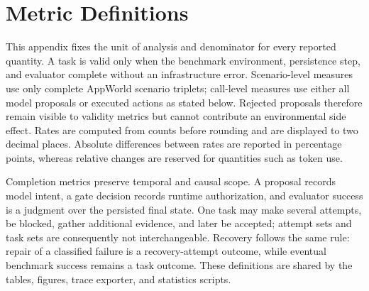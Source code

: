 \section{Metric Definitions}
\label{app:metrics}

This appendix fixes the unit of analysis and denominator for every reported
quantity. A task is valid only when the benchmark environment, persistence step,
and evaluator complete without an infrastructure error. Scenario-level measures
use only complete AppWorld scenario triplets; call-level measures use either all
model proposals or executed actions as stated below. Rejected proposals therefore
remain visible to validity metrics but cannot contribute an environmental side
effect. Rates are computed from counts before rounding and are displayed to two
decimal places. Absolute differences between rates are reported in percentage
points, whereas relative changes are reserved for quantities such as token use.

Completion metrics preserve temporal and causal scope. A proposal records model
intent, a gate decision records runtime authorization, and evaluator success is a
judgment over the persisted final state. One task may make several attempts, be
blocked, gather additional evidence, and later be accepted; attempt sets and task
sets are consequently not interchangeable. Recovery follows the same rule: repair
of a classified failure is a recovery-attempt outcome, while eventual benchmark
success remains a task outcome. These definitions are shared by the tables,
figures, trace exporter, and statistics scripts.

